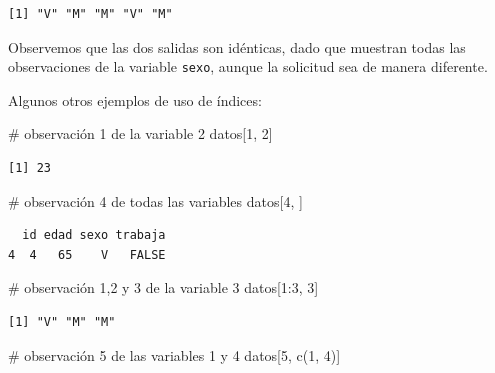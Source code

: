 \documentclass[
  spanish,
  letterpaper,
  DIV=11,
  numbers=noendperiod]{scrreprt}
\newenvironment{Shaded}{\begin{snugshade}}{\end{snugshade}}
\newcommand{\CommentTok}[1]{\textcolor[rgb]{0.37,0.37,0.37}{#1}}
\newcommand{\DecValTok}[1]{\textcolor[rgb]{0.68,0.00,0.00}{#1}}
\newcommand{\FunctionTok}[1]{\textcolor[rgb]{0.28,0.35,0.67}{#1}}
\newcommand{\NormalTok}[1]{\textcolor[rgb]{0.00,0.23,0.31}{#1}}
\newcommand{\SpecialCharTok}[1]{\textcolor[rgb]{0.37,0.37,0.37}{#1}}
\begin{document}
\begin{verbatim}
[1] "V" "M" "M" "V" "M"
\end{verbatim}

Observemos que las dos salidas son idénticas, dado que muestran todas
las observaciones de la variable \texttt{sexo}, aunque la solicitud sea
de manera diferente.

Algunos otros ejemplos de uso de índices:

\begin{Shaded}
\begin{Highlighting}[]
\CommentTok{\# observación 1 de la variable 2}
\NormalTok{datos[}\DecValTok{1}\NormalTok{, }\DecValTok{2}\NormalTok{]}
\end{Highlighting}
\end{Shaded}

\begin{verbatim}
[1] 23
\end{verbatim}

\begin{Shaded}
\begin{Highlighting}[]
\CommentTok{\# observación 4 de todas las variables}
\NormalTok{datos[}\DecValTok{4}\NormalTok{, ]}
\end{Highlighting}
\end{Shaded}

\begin{verbatim}
  id edad sexo trabaja
4  4   65    V   FALSE
\end{verbatim}

\begin{Shaded}
\begin{Highlighting}[]
\CommentTok{\# observación 1,2 y 3 de la variable 3}
\NormalTok{datos[}\DecValTok{1}\SpecialCharTok{:}\DecValTok{3}\NormalTok{, }\DecValTok{3}\NormalTok{]}
\end{Highlighting}
\end{Shaded}

\begin{verbatim}
[1] "V" "M" "M"
\end{verbatim}

\begin{Shaded}
\begin{Highlighting}[]
\CommentTok{\# observación 5 de las variables 1 y 4}
\NormalTok{datos[}\DecValTok{5}\NormalTok{, }\FunctionTok{c}\NormalTok{(}\DecValTok{1}\NormalTok{, }\DecValTok{4}\NormalTok{)]}
\end{Highlighting}
\end{Shaded}
\end{document}
